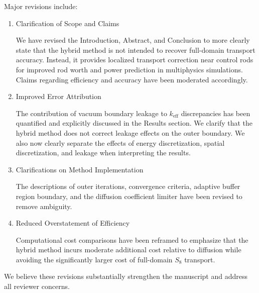 \documentclass[answers,11pt]{exam}
\begin{document}
Major revisions include:
%
\begin{enumerate}
  \item Clarification of Scope and Claims

We have revised the Introduction, Abstract, and Conclusion to more clearly state that the hybrid
method is not intended to recover full-domain transport accuracy. Instead, it provides localized
transport correction near control rods for improved rod worth and power prediction in multiphysics
simulations. Claims regarding efficiency and accuracy have been moderated accordingly.

  \item Improved Error Attribution

    The contribution of vacuum boundary leakage to $k_\text{eff}$ discrepancies has been quantified and
explicitly discussed in the Results section. We clarify that the hybrid method does not correct
leakage effects on the outer boundary.
We also now clearly separate the effects of energy discretization, spatial discretization, and
leakage when interpreting the results.

  \item Clarifications on Method Implementation

The descriptions of outer iterations, convergence criteria, adaptive buffer region boundary, and the
diffusion coefficient limiter have been revised to remove ambiguity.

  \item Reduced Overstatement of Efficiency

Computational cost comparisons have been reframed to emphasize that the hybrid method incurs
moderate additional cost relative to diffusion while avoiding the significantly larger cost of
full-domain $S_8$ transport.
\end{enumerate}

We believe these revisions substantially strengthen the manuscript and address all reviewer concerns.

\end{document}
